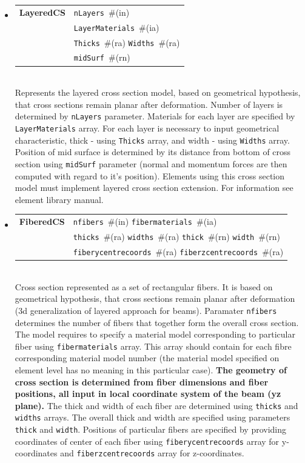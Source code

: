 \documentclass[a4paper]{article}
\makeatletter
\newcommand{\param}[1]{\texttt{#1}} %
\newcommand{\field}[2]{\param{#1}~\#{\tiny(#2)}} %
\newcommand{\entKeywordInst}[1]{\textbf{#1}} %
\newenvironment{record}[1][]{\begin{tabular}{|ll}}{\end{tabular}\\}
\newcommand{\recentry}[2]{{#1}&{#2}\\}
\newcounter{rcc}
\newenvironment{record}[1][\textwidth]{\setcounter{rcc}{0}\begin{tabular*}{#1}{|ll@{\extracolsep{\fill}}r}}{\end{tabular*}\\}
\newcommand{\recentry}[2]{\ifthenelse{\value{rcc}>0}{&$\backslash$ \\}{\setcounter{rcc}{1}}{#1}&{#2}}
\makeatother
\begin{document}
\begin{itemize}
\item
\begin{record}[0.9\textwidth]
  \recentry{\entKeywordInst{LayeredCS}}{\field{nLayers}{in}}
  \recentry{}{\field{LayerMaterials}{ia}}
  \recentry{}{\field{Thicks}{ra} \field{Widths}{ra}}
  \recentry{}{\field{mid\-Surf}{rn}}
\end{record}
Represents the layered cross section model, based on
geometrical hypothesis, that cross sections remain planar after
deformation. Number of layers is
determined by \param{nLayers} parameter. Materials for each
layer are specified by \param{LayerMaterials} array. For each layer is
necessary to input
geometrical characteristic, thick - using \param{Thicks} array, and
width - using
\param{Widths} array. Position of mid surface is determined by its
distance from
bottom of cross section using \param{mid\-Surf} parameter (normal and
momentum forces are then computed with regard to it's position).
Elements using this cross section model must implement layered cross
section extension. For information see element library manual.
\item
\begin{record}[0.9\textwidth]
  \recentry{\entKeywordInst{FiberedCS}}{\field{nfibers}{in} \field{fibermaterials}{ia}}
  \recentry{}{\field{thicks}{ra} \field{widths}{ra} \field{thick}{rn} \field{width}{rn}}
  \recentry{}{\field{fiberycentrecoords}{ra} \field{fiberzcentrecoords}{ra}}
\end{record}
Cross section represented as a set of rectangular fibers. It is based on
geometrical hypothesis, that cross sections remain planar after
deformation (3d generalization of layered approach for beams).
Paramater \param{nfibers} determines the number of fibers that together form the overall cross section.
The model requires to specify a material model corresponding to particular fiber using \param{fibermaterials} array. This array should contain for each fibre corresponding material model number (the material model specified on element level has no meaning in this particular case).
\textbf{The geometry of cross section is determined from fiber dimensions and fiber positions, all input in local coordinate system of the beam (yz plane).} The thick and width of each fiber are determined using \param{thicks} and \param{widths} arrays. The overall thick and width are specified using parameters \param{thick} and \param{width}. Positions of particular fibers are specified by providing coordinates of center of each fiber using \param{fiberycentrecoords} array for y-coordinates and \param{fiberzcentrecoords} array for z-coordinates.
\end{itemize}
\end{document}
